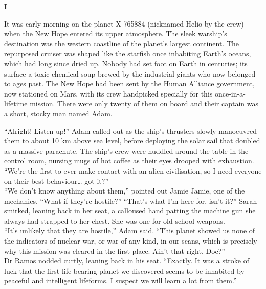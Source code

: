 \begin{center}
\Large \textbf{I}
\end{center}

It was early morning on the planet X-765884 (nicknamed Helio by the crew) when the New Hope entered its upper atmosphere. The sleek warship’s destination was the western coastline of the planet’s largest continent. The repurposed cruiser was shaped like the starfish once inhabiting Earth’s oceans, which had long since dried up. Nobody had set foot on Earth in centuries; its surface a toxic chemical soup brewed by the industrial giants who now belonged to ages past. The New Hope had been sent by the Human Alliance government, now stationed on Mars, with its crew handpicked specially for this once-in-a-lifetime mission. There were only twenty of them on board and their captain was a short, stocky man named Adam.

“Alright! Listen up!” Adam called out as the ship’s thrusters slowly manoeuvred them to about 10 km above sea level, before deploying the solar sail that doubled as a massive parachute. The ship’s crew were huddled around the table in the control room, nursing mugs of hot coffee as their eyes drooped with exhaustion.\\
“We’re the first to ever make contact with an alien civilisation, so I need everyone on their best behaviour… got it?”\\
“We don’t know anything about them,” pointed out Jamie
Jamie, one of the mechanics. “What if they’re hostile?”
“That’s what I’m here for, isn’t it?” Sarah smirked, leaning back in her seat, a calloused hand patting the machine gun she always had strapped to her chest. She was one for old school weapons.\\
“It’s unlikely that they are hostile,” Adam said. “This planet showed us none of the indicators of nuclear war, or war of any kind, in our scans, which is precisely why this mission was cleared in the first place. Ain’t that right, Doc?”\\
Dr Ramos nodded curtly, leaning back in his seat. “Exactly. It was a stroke of luck that the first life-bearing planet we discovered seems to be inhabited by peaceful and intelligent lifeforms. I suspect we will learn a lot from them.”

